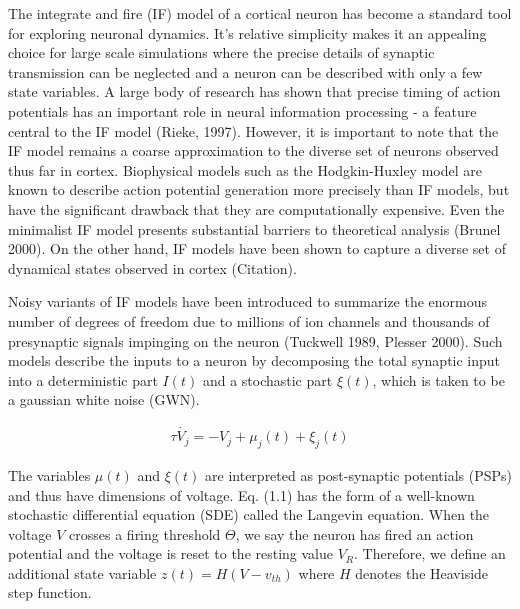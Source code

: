 \documentclass{ucetd}
\begin{document}
The integrate and fire (IF) model of a cortical neuron has become a standard tool for exploring neuronal dynamics. It's relative simplicity makes it an appealing choice for large scale simulations where the precise details of synaptic transmission can be neglected and a neuron can be described with only a few state variables. A large body of research has shown that precise timing of action potentials has an important role in neural information processing - a feature central to the IF model (Rieke, 1997). However, it is important to note that the IF model remains a coarse approximation to the diverse set of neurons observed thus far in cortex. Biophysical models such as the Hodgkin-Huxley model are known to describe action potential generation more precisely than IF models, but have the significant drawback that they are computationally expensive. Even the minimalist IF model presents substantial barriers to theoretical analysis (Brunel 2000). On the other hand, IF models have been shown to capture a diverse set of dynamical states observed in cortex (Citation). 

Noisy variants of IF models have been introduced to summarize the enormous number of degrees of freedom due to millions of ion channels and thousands of presynaptic signals impinging on the neuron (Tuckwell 1989, Plesser 2000). Such models describe the inputs to a neuron by decomposing the total synaptic input into a deterministic part $I(t)$ and a stochastic part $\xi(t)$, which is taken to be a gaussian white noise (GWN). 

\begin{align}
\tau\dot{V_{j}} = -V_{j} + \mu_{j}(t) + \xi_{j}(t)
\end{align}

The variables $\mu(t)$ and $\xi(t)$ are interpreted as post-synaptic potentials (PSPs) and thus have dimensions of voltage. Eq. (1.1) has the form of a well-known stochastic differential equation (SDE) called the Langevin equation. When the voltage $V$ crosses a firing threshold $\Theta$, we say the neuron has fired an action potential and the voltage is reset to the resting value $V_{R}$. Therefore, we define an additional state variable $z(t) = H(V-v_{th})$ where $H$ denotes the Heaviside step function.
\end{document}

